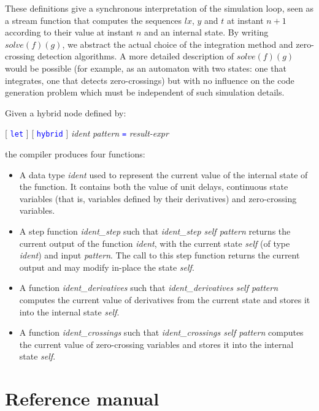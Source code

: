 \documentclass[11pt,titlepage,twoside]{report}
\newcommand{\lx}{\ensuremath{\mathit{lx}}}
\newcommand{\Solve}[2]{\mathit{solve}({#1})({#2})}
\newcommand{\term}[1]{\textcolor{Blue}{\tt #1}}
\newcommand{\nterm}[1]{\textcolor{BrickRed}{\it #1}}
\newcommand{\term}[1]{{\tt #1}}
\newcommand{\nterm}[1]{{\em #1}}
\begin{document}
These definitions give a synchronous interpretation of the simulation loop,
seen as a stream function that computes the sequences $\lx$, $y$ and $t$
at instant $n+1$ according to their value at instant $n$ and an
internal state. By writing $\Solve{f}{g}$, we abstract the
actual choice of the integration method and zero-crossing detection
algorithms. A more detailed description of $\Solve{f}{g}$ would be
possible (for example, as an automaton with two states: one that integrates, 
one that detects zero-crossings) but with no influence on
the code generation problem which must be independent of such simulation
details. 


Given a hybrid node defined by:
\begin{center}
  [ \term{let} ] [ \term{hybrid} ] \nterm{ident} \nterm{pattern} \term{=}
  \nterm{result-expr}
\end{center}
the compiler produces four functions:

\begin{itemize}
\item
  A data type \nterm{ident} used to represent the current
  value of the internal state of the function. It contains both the
  value of unit delays, continuous state variables (that is, variables
  defined by their derivatives) and zero-crossing variables.
\item
  A step function \nterm{ident\_step} such that
    \nterm{ident\_step self pattern} returns the current output of the function
    \nterm{ident}, with the current state \nterm{self} (of type
    \nterm{ident}) and input \nterm{pattern}. The call to this step
    function returns the current output and may modify in-place
    the state \nterm{self}.
  \item
    A function \nterm{ident\_derivatives} such that
    \nterm{ident\_derivatives self pattern} computes the
    current value of derivatives from the current state and stores it
    into the internal state \nterm{self}.
  \item
    A function \nterm{ident\_crossings} such that
    \nterm{ident\_crossings self pattern} computes the
    current value of zero-crossing variables and stores it into the
    internal state \nterm{self}. 
\end{itemize}

\cleardoublepage
\part{Reference manual\label{refman}}
\cleardoublepage
\end{document}
